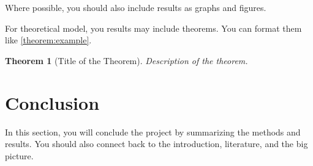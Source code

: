 \documentclass[12pt]{article}
\newtheorem{theorem}{Theorem}
\begin{document}
\begin{table}[ht]
    \centering
    \caption{Regression Results}
    \label{tab:regressiontable}
    
    \caption*{\footnotesize \textit{Note: Describe the table above.}}
\end{table}

Where possible, you should also include results as graphs and figures.

For theoretical model, you results may include theorems. You can format them like \autoref{theorem:example}.
\begin{theorem}[Title of the Theorem]\label{theorem:example}
    Description of the theorem.
\end{theorem}

\section{Conclusion}
In this section, you will conclude the project by summarizing the methods and results. You should also connect back to the introduction, literature, and the big picture.

\newpage
\singlespacing

\end{document}

